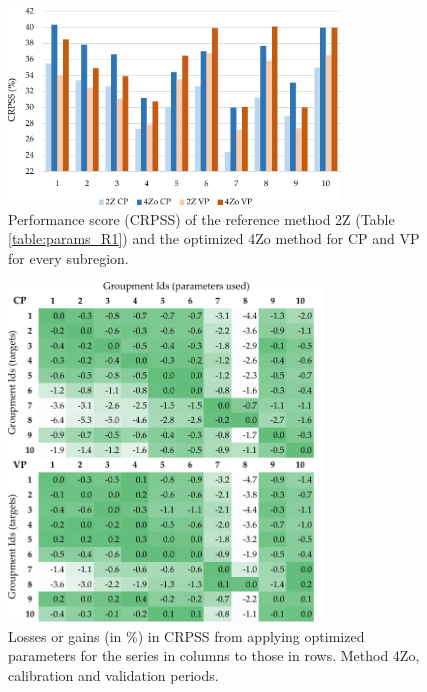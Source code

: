 \documentclass[review]{elsarticle}
\begin{document}
\begin{figure}[t]
	\centerline{\includegraphics[width=8.8cm]{figures/fig04.pdf}}
	\caption{Performance score (CRPSS) of the reference method 2Z (Table \ref{table:params_R1}) and the optimized 4Zo method for CP and VP for every subregion.}
	\label{fig:figure_crpss_4Zo}
\end{figure}

\begin{figure}[t]
	\centerline{\includegraphics[width=8.4cm]{figures/fig05.pdf}}
	\caption{Losses or gains (in \%) in CRPSS from applying optimized parameters for the series in columns to those in rows. Method 4Zo, calibration and validation periods.}
	\label{fig:crossing_4Zo}
\end{figure}
\end{document}
